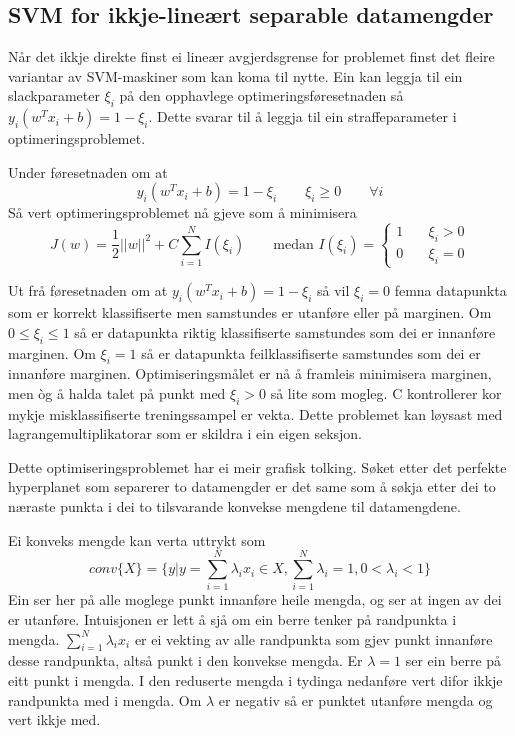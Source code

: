 \documentclass[oneside, nynorsk]{book}
\begin{document}
\subsection{SVM for ikkje-lineært separable datamengder}
Når det ikkje direkte finst ei lineær avgjerdsgrense for problemet finst det fleire variantar av SVM-maskiner som kan koma til nytte.
Ein kan leggja til ein slackparameter $\xi_i$ på den opphavlege optimeringsføresetnaden så $y_i(w^Tx_i+b)=1-\xi_i$.
Dette svarar til å leggja til ein straffeparameter i optimeringsproblemet.
\begin{center}
  Under føresetnaden om at \[y_i(w^Tx_i+b)=1-\xi_i \qquad \xi_i \geq 0 \qquad \forall i\]
  Så vert optimeringsproblemet nå gjeve som å minimisera
\[J(w)=\frac{1}{2}||w||^2+C\sum_{i=1}^N I(\xi_i) \qquad \text{medan $I(\xi_i)=\begin{cases}
       1 &\quad \xi_i>0 \\
       0 &\quad \xi_i=0
     \end{cases}$}\]
\end{center}
Ut frå føresetnaden om at $y_i(w^Tx_i+b)=1-\xi_i$ så vil $\xi_i=0$ femna datapunkta som er korrekt klassifiserte men samstundes er utanføre eller på marginen.
Om $0\leq \xi_i \leq 1$ så er datapunkta riktig klassifiserte samstundes som dei er innanføre marginen. Om $\xi_i=1$ så er datapunkta feilklassifiserte samstundes som dei er innanføre marginen.
Optimiseringsmålet er nå å framleis minimisera marginen, men òg å halda talet på punkt med $\xi_i>0$ så lite som mogleg.
C kontrollerer kor mykje misklassifiserte treningssampel er vekta. Dette problemet kan løysast med lagrangemultiplikatorar som er skildra i ein eigen seksjon.

Dette optimiseringsproblemet har ei meir grafisk tolking.
Søket etter det perfekte hyperplanet som separerer to datamengder er det same som å søkja etter dei to næraste punkta i dei to tilsvarande konvekse mengdene til datamengdene.

Ei konveks mengde kan verta uttrykt som
\[conv\{X\}=\{ y | y=\sum_{i=1}^N \lambda_i x_i \in X, \sum_{i=1}^N \lambda_i=1, 0<\lambda_i<1\}\]
Ein ser her på alle moglege punkt innanføre heile mengda, og ser at ingen av dei er utanføre.
Intuisjonen er lett å sjå om ein berre tenker på randpunkta i mengda. $\sum_{i=1}^N \lambda_i x_i$ er ei vekting av alle
randpunkta som gjev punkt innanføre desse randpunkta, altså punkt i den konvekse mengda. Er $\lambda=1$ ser ein berre på eitt punkt i mengda.
I den reduserte mengda i tydinga nedanføre vert difor ikkje randpunkta med i mengda. Om $\lambda$ er negativ så er
punktet utanføre mengda og vert ikkje med.
\end{document}
